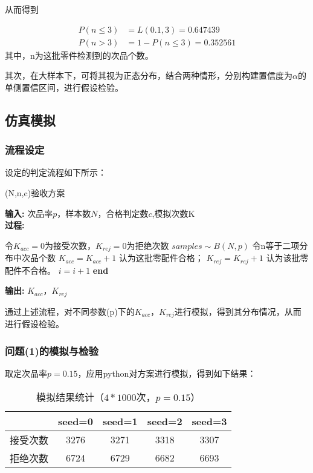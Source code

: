 \documentclass[a4paper,12pt]{ctexart} %
\begin{document}
从而得到

\begin{align*}
	P\left( n \leqslant 3 \right) &=L(0.1,3)=0.647439
	\\
	P\left( n> 3  \right) &=1-P\left( n \leqslant 3 \right)=0.352561
\end{align*}
其中，n为这批零件检测到的次品个数。

其次，在大样本下，可将其视为正态分布，结合两种情形，分别构建置信度为$\alpha$的单侧置信区间，进行假设检验。


\subsection{仿真模拟}
\subsubsection{流程设定}
设定的判定流程如下所示：
\begin{center}
	\begin{minipage}{0.95\textwidth}
		\begin{algorithm}[H]%
			\caption{(N,n,c)验收方案} %
			\label{1}
			{\bf 输入:} 次品率$p$，样本数$N$，合格判定数$c$,模拟次数K\\
			{\bf 过程:} 
			\begin{algorithmic}[1]
				\State 令$K_{acc} = 0$为接受次数，$K_{rej} = 0$为拒绝次数
				\State $samples \sim B(N,p) $
				\State 令n等于二项分布中次品个数
				\State $K_{acc} = K_{acc} + 1$
				\State 认为这批零配件合格；
				\Else
				\State $K_{rej} = K_{rej} + 1$
				\State 认为该批零配件不合格。
				\EndIf
				\State 	$i=i+1$
				\EndFor
				\State 	\textbf{end}
			\end{algorithmic}
			{\bf 输出:} %
			$K_{acc}$，$K_{rej}$
		\end{algorithm}
	\end{minipage}
\end{center}

通过上述流程，对不同参数(p)下的$K_{acc}$，$K_{rej}$进行模拟，得到其分布情况，从而进行假设检验。

\subsubsection{问题(1)的模拟与检验}
取定次品率$p = 0.15$，应用python对方案进行模拟，得到如下结果：
\begin{table}[H]
    \centering
    \caption{模拟结果统计（$4*1000$次，$p=0.15$）}
    \begin{tabular}{ccccc}
    \toprule[1.5pt]
        ~ & seed=0 & seed=1 & seed=2 & seed=3 \\ \midrule[0.75pt]
        接受次数 & 3276 & 3271 & 3318 & 3307 \\ 
        拒绝次数 & 6724 & 6729 & 6682 & 6693 \\ \bottomrule[1.5pt]
    \end{tabular}
\end{table}
\end{document}
